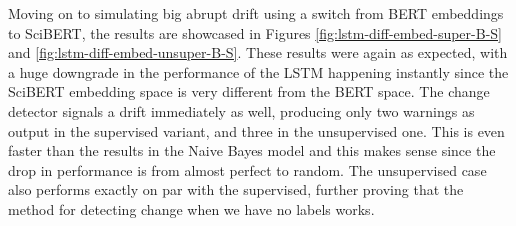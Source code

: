 \documentclass[12pt]{extreport}
\begin{document}
Moving on to simulating big abrupt drift using a switch from BERT embeddings to SciBERT, the results are showcased in Figures \ref{fig:lstm-diff-embed-super-B-S} and \ref{fig:lstm-diff-embed-unsuper-B-S}. These results were again as expected, with a huge downgrade in the performance of the LSTM happening instantly since the SciBERT embedding space is very different from the BERT space. The change detector signals a drift immediately as well, producing only two warnings as output in the supervised variant, and three in the unsupervised one. This is even faster than the results in the Naive Bayes model and this makes sense since the drop in performance is from almost perfect to random. The unsupervised case also performs exactly on par with the supervised, further proving that the method for detecting change when we have no labels works.
\end{document}
